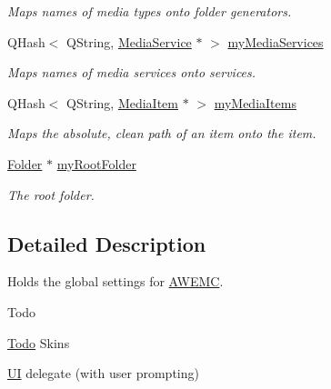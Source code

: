 \begin{DoxyCompactItemize}
\begin{DoxyCompactList}\small\item\em Maps names of media types onto folder generators. \end{DoxyCompactList}\item 
\hypertarget{class_a_w_e_1_1_global_settings_a9fdf25f072ae5c96cc75afcb8dfc01b7}{Q\-Hash$<$ Q\-String, \hyperlink{class_a_w_e_1_1_media_service}{Media\-Service} $\ast$ $>$ \hyperlink{class_a_w_e_1_1_global_settings_a9fdf25f072ae5c96cc75afcb8dfc01b7}{my\-Media\-Services}}\label{class_a_w_e_1_1_global_settings_a9fdf25f072ae5c96cc75afcb8dfc01b7}

\begin{DoxyCompactList}\small\item\em Maps names of media services onto services. \end{DoxyCompactList}\item 
\hypertarget{class_a_w_e_1_1_global_settings_ac58bb8a42cc079c33c018718e401f262}{Q\-Hash$<$ Q\-String, \hyperlink{class_a_w_e_1_1_media_item}{Media\-Item} $\ast$ $>$ \hyperlink{class_a_w_e_1_1_global_settings_ac58bb8a42cc079c33c018718e401f262}{my\-Media\-Items}}\label{class_a_w_e_1_1_global_settings_ac58bb8a42cc079c33c018718e401f262}

\begin{DoxyCompactList}\small\item\em Maps the absolute, clean path of an item onto the item. \end{DoxyCompactList}\item 
\hypertarget{class_a_w_e_1_1_global_settings_a4ca5d08ff7a32714da973ec0973edb34}{\hyperlink{class_a_w_e_1_1_folder}{Folder} $\ast$ \hyperlink{class_a_w_e_1_1_global_settings_a4ca5d08ff7a32714da973ec0973edb34}{my\-Root\-Folder}}\label{class_a_w_e_1_1_global_settings_a4ca5d08ff7a32714da973ec0973edb34}

\begin{DoxyCompactList}\small\item\em The root folder. \end{DoxyCompactList}\end{DoxyCompactItemize}


\subsection{Detailed Description}
Holds the global settings for \hyperlink{class_a_w_e_1_1_a_w_e_m_c}{A\-W\-E\-M\-C}. 

\begin{DoxyRefDesc}{Todo}
\item[\hyperlink{todo__todo000008}{Todo}]Skins 

\hyperlink{namespace_u_i}{U\-I} delegate (with user prompting)\end{DoxyRefDesc}


